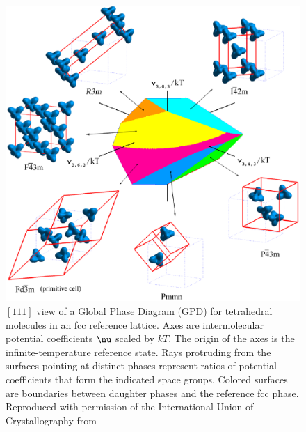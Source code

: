 \documentclass[preprint]{iucr}              %
\newcommand{\mb}[1]{\ensuremath{\mbox{\boldmath $ #1 $}}}
\begin{document}

\pagebreak


%
%
%

\pagebreak

\begin{figure}
\caption{$[111]$ view of a Global Phase Diagram (GPD) for tetrahedral
molecules in an fcc reference lattice.  Axes are intermolecular potential
coefficients $\mb{\nu}$ scaled by $kT$. The origin of the axes is the infinite-temperature reference state.  Rays protruding from the surfaces
pointing at distinct phases represent ratios of potential
coefficients that form the indicated space groups.  Colored surfaces are boundaries between daughter phases
and the reference fcc phase. Reproduced with permission of the International
Union of Crystallography from \cite{Mettes04}} \label{gpd1}
\includegraphics{figure1aII.eps}
\end{figure}
\end{document}
